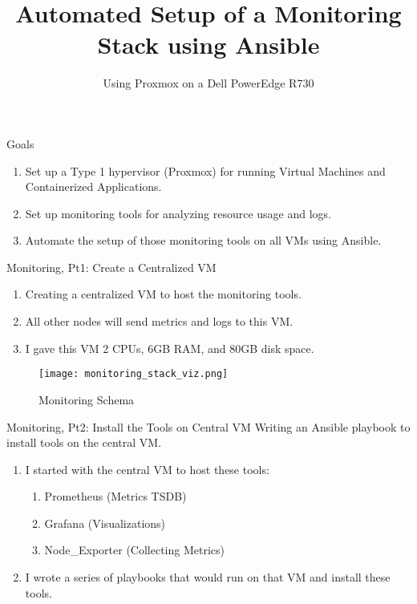 \documentclass[14pt,compress,usenames,dvipsnames,aspectratio=169]{beamer}
\title{\textbf{Automated Setup of a Monitoring Stack using Ansible}}
\author{Using Proxmox on a Dell PowerEdge R730}
\date{}  %
\begin{document}

\begin{frame}[plain]
\titlepage
\end{frame}


\begin{frame}{Goals}
    \begin{enumerate}
        \item{Set up a Type 1 hypervisor (Proxmox) for running Virtual Machines and
            Containerized Applications.} 
        \item{Set up monitoring tools for analyzing resource usage and logs. }
        \item{Automate the setup of those monitoring tools on all VMs using Ansible.}
    \end{enumerate}
\end{frame}


\begin{frame}{Monitoring, Pt1: Create a Centralized VM}
    \begin{enumerate}
        \item{Creating a centralized VM to host the monitoring tools.} 
        \item{All other nodes will send metrics and logs to this VM.}
        \item{I gave this VM 2 CPUs, 6GB RAM, and 80GB disk space.}
    \end{enumerate}
    \begin{figure}
        \centering
        \texttt{[image: monitoring\_stack\_viz.png]}
        \caption{Monitoring Schema}
        \label{fig:enter-label}
    \end{figure} 
\end{frame}


\begin{frame}{Monitoring, Pt2: Install the Tools on Central VM}
    Writing an Ansible playbook to install tools on the central VM.
    \begin{enumerate}
        \item{I started with the central VM to host these tools:} 
            \begin{enumerate}
                \item{Prometheus (Metrics TSDB)}
                \item{Grafana (Visualizations)}
                \item{Node_Exporter (Collecting Metrics)}
            \end{enumerate}
        \item{I wrote a series of playbooks that would run on that VM and install these tools.}
    \end{enumerate}
\end{frame}
\end{document}
